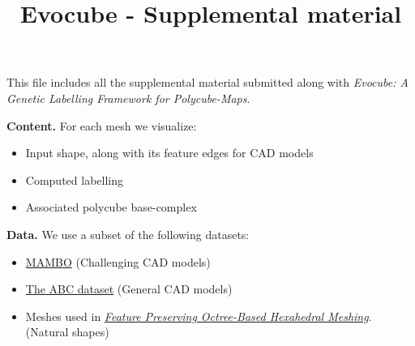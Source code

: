 \normalsize%
\title{Evocube {-} Supplemental material}%
\date{}%
\maketitle%
\large%
This file includes all the supplemental material submitted along with \textit{Evocube: A Genetic Labelling Framework for Polycube-Maps}.%

%
\vspace{20pt}%
\textbf{Content. }%
For each mesh we visualize:%
\begin{itemize}%
\item%
Input shape, along with its feature edges for CAD models%
\item%
Computed labelling%
\item%
Associated polycube base{-}complex%
\end{itemize}%

%
\vspace{20pt}%
\textbf{Data. }%
We use a subset of the following datasets:%
\begin{itemize}%
\item%
\href{https://gitlab.com/franck.ledoux/mambo}{MAMBO} (Challenging CAD models)%
\item%
\href{https://deep-geometry.github.io/abc-dataset/}{The ABC dataset} (General CAD models)%
\item%
Meshes used in \href{https://gaoxifeng.github.io/}{\textit{Feature Preserving Octree-Based Hexahedral Meshing}}. (Natural shapes)%
\end{itemize}%
%
\vspace{20pt}%
\normalsize%
\clearpage%
%
%